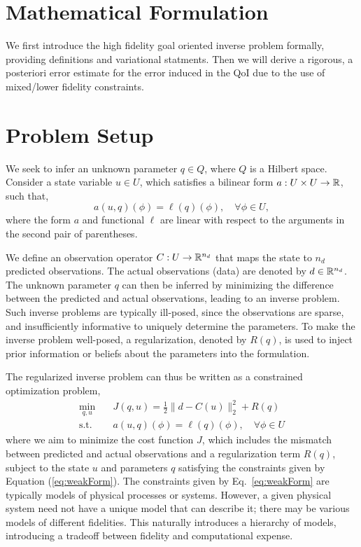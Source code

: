 \section{Mathematical Formulation}\label{sect:form}
%
We first introduce the high fidelity goal oriented inverse problem formally, providing definitions and variational statments. Then we will derive a rigorous, a posteriori error estimate for the error induced in the QoI due to the use of mixed/lower fidelity constraints.

\section{Problem Setup}  \label{sec:setup}
%
We seek to infer an unknown parameter $q \in Q$, where $Q$ is a Hilbert space. Consider a state variable $u \in U$, which satisfies a bilinear form $a:U \times U \to {\mathbb{R}}$, such that,
%
\begin{equation}
\label{eq:weakForm}
a(u,q)(\phi)=\ell(q)(\phi),\quad\forall\phi\in U,
\end{equation}
%
where the form $a$ and functional $\ell$ are linear with respect to the arguments in the second pair of parentheses.

We define an observation operator $C:U\to{\mathbb{R}}^{n_d}$ that maps the state to $n_d$ predicted observations. The actual observations (data) are denoted by $d\in{\mathbb{R}}^{n_d}$. The unknown parameter $q$ can then be inferred by minimizing the difference between the predicted and actual observations, leading to an inverse problem. Such inverse problems are typically ill-posed, since the observations are sparse, and insufficiently informative to uniquely determine the parameters. To make the inverse problem well-posed, a regularization, denoted by $R(q)$, is used to inject prior information or beliefs about the parameters into the formulation.

The regularized inverse problem can thus be written as a constrained optimization problem,
%
\begin{subequations}
\label{eq:invOpt}
\begin{align}
\min\limits_{q,u} & \quad J(q,u)=\frac{1}{2}\|d-C(u)\|_2^2 + R(q) \label{eq:invOpt_obj} \\
\textrm{s.t. }& \quad a(u,q)(\phi)=\ell(q)(\phi),\quad\forall\phi\in U \label{eq:invOpt_cons}
\end{align}
\end{subequations}
%
where we aim to minimize the cost function $J$, which includes the mismatch between predicted and actual observations and a regularization term $R(q)$, subject to the state $u$ and parameters $q$ satisfying the constraints given by Equation (\ref{eq:weakForm}). The constraints given by Eq.~\eqref{eq:weakForm} are typically models of physical processes or systems. However, a given physical system need not have a unique model that can describe it; there may be various models of different fidelities. This naturally introduces a hierarchy of models, introducing a tradeoff between fidelity and computational expense.

